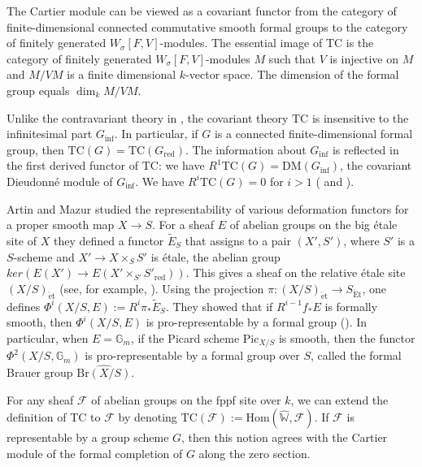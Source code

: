 \documentclass[a4paper,12pt,twoside]{report}
\newcommand{\G}{\mathbb{G}}
\newcommand{\et}{\mathrm{\acute{e}t}}
\newcommand{\Et}{\mathrm{\acute{E}t}}
\newcommand{\Pic}{\mathrm{Pic}}
\newcommand{\Br}{\mathrm{Br}}
\newcommand{\Hom}{\mathrm{Hom}}
\newcommand{\TC}{\mathrm{TC}}
\newcommand{\DM}{\mathrm{DM}}
\newcommand{\red}{\mathrm{red}}
\newcommand{\W}{\mathbb{W}}
\begin{document}
 
The Cartier module can be viewed as a covariant functor from the category of finite-dimensional connected
commutative smooth formal groups to the category of  finitely generated $W_{\sigma}[F,V]$-modules. 
The essential image of $\TC$ is the category of finitely generated $W_{\sigma}[F,V]$-modules $M$ 
such that $V$ is injective 
on $M$ and $M/VM$ is a finite dimensional $k$-vector space. 
The dimension of the formal group equals $\dim_k M/VM$. 

Unlike the contravariant theory in \cite{Man}, the covariant theory $\TC$ is insensitive to the infinitesimal part $G_{\inf}$. 
In particular, if $G$ is a connected finite-dimensional formal group, 
then $\TC(G)=\TC(G_{\red})$. The information about $G_{\inf}$ is reflected in the first derived functor of $\TC$: 
we have $R^1\TC(G)=\DM(G_{\inf})$, the covariant Dieudonn\'e module of $G_{\inf}$. 
We have $R^i\TC(G)=0$ for $i>1$ (\cite[Remark 11.10]{BO} and \cite[Theorem 4.2(c)]{Oo}). 

Artin and Mazur \cite{AM} studied the representability of 
various deformation functors for a proper smooth map $X \rightarrow S$. 
For a sheaf $E$ of abelian groups on the big \'etale site of $X$
they defined a functor $\widetilde{E}_S$ that assigns
to a pair $(X',S')$, where $S'$ is a $S$-scheme and $X'\rightarrow X\times_S S'$ is \'etale, 
the abelian group $ker(E(X')\rightarrow E(X'\times_{S'} S'_{\red}))$. 
This gives a sheaf on the relative \'etale site $(X/S)_{\et}$ (see, for example, \cite[Section 2.3]{BL}). 
Using the projection $\pi: (X/S)_{\et}\rightarrow S_{\Et}$, 
one defines $\Phi^i(X/S,E):=R^i\pi_*\widetilde{E}_S$. 
They showed that if $R^{i-1}f_*E$ is formally smooth, 
then $\Phi^i(X/S,E)$ is pro-representable by a formal group (\cite[Proposition 1.8]{AM}). 
In particular, when $E=\G_m$, if the Picard scheme $\Pic_{X/S}$ is smooth, then
the functor $\Phi^2(X/S,\G_m)$ is pro-representable by a formal group over $S$, called
the formal Brauer group $\widehat{\Br(X/S)}$.

For any sheaf $\mathcal{F}$ of abelian groups on the fppf site over $k$, 
we can extend the definition of TC to $\mathcal{F}$ by denoting 
$\TC(\mathcal{F}):=\Hom(\widehat{\W},\mathcal{F})$. 
If $\mathcal{F}$ is representable by a group scheme $G$, then this notion agrees 
with the Cartier module of the formal completion of $G$ along the zero section. 
\end{document}
